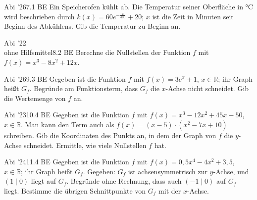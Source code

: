 \documentclass[11pt]{article}
\begin{document}
\pfgruppe{}
\begin{pfaufg}{Abi ’26}{7.}{1 BE}
Ein Speicherofen kühlt ab. Die Temperatur seiner Oberfläche in °C wird beschrieben durch $k(x) = 60e^{-\tfrac{x}{400}} + 20$; $x$ ist die Zeit in Minuten seit Beginn des Abkühlens. Gib die Temperatur zu Beginn an.
\end{pfaufg}
\pfgruppe{}
\begin{pfaufg}{Abi ’22\\ohne Hilfsmittel}{8.}{2 BE}
Berechne die Nullstellen der Funktion $f$ mit $f(x) = x^3 - 8x^2 + 12x$.
\end{pfaufg}
\pfgruppe{}
\begin{pfaufg}{Abi ’26}{9.}{3 BE}
Gegeben ist die Funktion $f$ mit $f(x) = 3e^x + 1$, $x \in \mathbb{R}$; ihr Graph heißt $G_f$. Begründe am Funktionsterm, dass $G_f$ die $x$-Achse nicht schneidet. Gib die Wertemenge von $f$ an.
\par\smallskip\noindent {}\par
{}
\fusshilfe{\mbox{9:~Wertemenge ]1}}
\end{pfaufg}
\pfgruppe{}
\begin{pfaufg}{Abi ’23}{10.}{4 BE}
Gegeben ist die Funktion $f$ mit $f(x) = x^3 - 12x^2 + 45x - 50$, $x \in \mathbb{R}$. Man kann den Term auch als $f(x) = (x - 5)\cdot(x^2 - 7x + 10)$ schreiben. Gib die Koordinaten des Punkts an, in dem der Graph von $f$ die $y$-Achse schneidet. Ermittle, wie viele Nullstellen $f$ hat.
\end{pfaufg}
\pfgruppe{}
\begin{pfaufg}{Abi ’24}{11.}{4 BE}
Gegeben ist die Funktion $f$ mit $f(x) = 0{,}5x^4 - 4x^2 + 3{,}5$, $x \in \mathbb{R}$; ihr Graph heißt $G_f$. Gegeben: $G_f$ ist achsensymmetrisch zur $y$-Achse, und $(1 \mid 0)$ liegt auf $G_f$. Begründe ohne Rechnung, dass auch $(-1 \mid 0)$ auf $G_f$ liegt. Bestimme die übrigen Schnittpunkte von $G_f$ mit der $x$-Achse.
\end{pfaufg}
\end{document}
